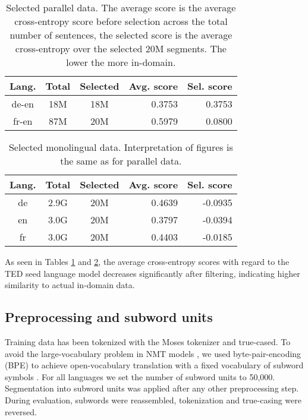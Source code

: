 \documentclass[11pt]{article}
\begin{document}
\begin{table}[h]
 \begin{tabular}{cccrr} \toprule
  Lang. & Total & Selected & Avg. score & Sel. score \\ \midrule
  de-en & 18M & 18M & 0.3753 & 0.3753 \\
  fr-en & 87M & 20M & 0.5979 & 0.0800 \\ \bottomrule
 \end{tabular}
 \caption{Selected parallel data. The average score is the average cross-entropy score before selection across the total number of sentences, the selected score is the average cross-entropy over the selected 20M segments. The lower the more in-domain.}\label{filter1}
\end{table}

\begin{table}[h] \centering
 \begin{tabular}{cccrr} \toprule
  Lang. & Total & Selected & Avg. score & Sel. score \\ \midrule
  de & 2.9G & 20M & 0.4639 & -0.0935 \\
  en & 3.0G & 20M & 0.3797 & -0.0394 \\ 
  fr & 3.0G & 20M & 0.4403 & -0.0185 \\ \bottomrule
 \end{tabular}
 \caption{Selected monolingual data. Interpretation of figures is the same as for parallel data.}\label{filter2}
\end{table}

As seen in Tables \ref{filter1} and \ref{filter2}, the average cross-entropy scores with regard to the TED seed language model decreases significantly after filtering, indicating higher similarity to actual in-domain data. 

\subsection{Preprocessing and subword units}
\label{preprocessing}

Training data has been tokenized with the Moses tokenizer and true-cased. 
To avoid the large-vocabulary problem in NMT models \cite{44929}, we used byte-pair-encoding (BPE) to achieve open-vocabulary translation with a fixed vocabulary of subword symbols \cite{DBLP:journals/corr/SennrichHB15}. For all languages we set the number of subword units to 50,000. Segmentation into subword units was applied after any other preprocessing step. 
During evaluation, subwords were reassembled, tokenization and true-casing were reversed. 
\end{document}
